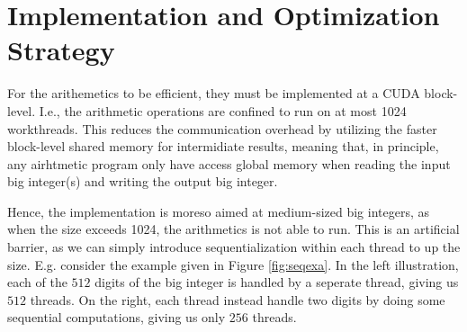 \section{Implementation and Optimization Strategy}
\label{sec:strat}

For the arithemetics to be efficient, they must be implemented at a CUDA
block-level. I.e., the arithmetic operations are confined to run on at most 1024
workthreads. This reduces the communication overhead by utilizing the faster
block-level shared memory for intermidiate results, meaning that, in principle,
any airhtmetic program only have access global memory when reading the input big
integer(s) and writing the output big integer.

Hence, the implementation is moreso aimed at medium-sized big integers, as when
the size exceeds 1024, the arithmetics is not able to run. This is an artificial
barrier, as we can simply introduce sequentialization within each thread to up
the size. E.g. consider the example given in Figure \ref{fig:seqexa}. In the
left illustration, each of the $512$ digits of the big integer is handled by a
seperate thread, giving us $512$ threads. On the right, each thread instead
handle two digits by doing some sequential computations, giving us only $256$
threads.

